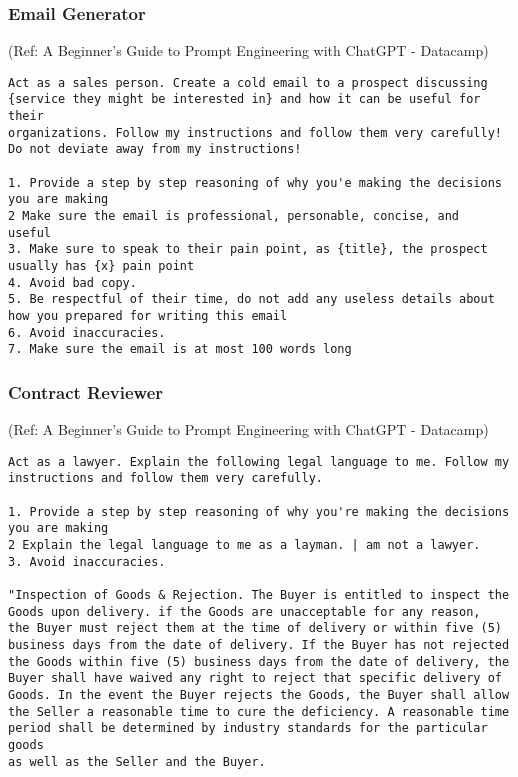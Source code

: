 \begin{frame}[fragile]\frametitle{Email Generator}

{\tiny (Ref: A Beginner's Guide to Prompt Engineering with ChatGPT - Datacamp)}


\begin{lstlisting}
Act as a sales person. Create a cold email to a prospect discussing
{service they might be interested in} and how it can be useful for their
organizations. Follow my instructions and follow them very carefully!
Do not deviate away from my instructions!

1. Provide a step by step reasoning of why you'e making the decisions
you are making
2 Make sure the email is professional, personable, concise, and
useful
3. Make sure to speak to their pain point, as {title}, the prospect
usually has {x} pain point
4. Avoid bad copy.
5. Be respectful of their time, do not add any useless details about
how you prepared for writing this email
6. Avoid inaccuracies.
7. Make sure the email is at most 100 words long
\end{lstlisting}		
		
\end{frame}

\begin{frame}[fragile]\frametitle{Contract Reviewer}

{\tiny (Ref: A Beginner's Guide to Prompt Engineering with ChatGPT - Datacamp)}


\begin{lstlisting}
Act as a lawyer. Explain the following legal language to me. Follow my
instructions and follow them very carefully.

1. Provide a step by step reasoning of why you're making the decisions
you are making
2 Explain the legal language to me as a layman. | am not a lawyer.
3. Avoid inaccuracies.

"Inspection of Goods & Rejection. The Buyer is entitled to inspect the
Goods upon delivery. if the Goods are unacceptable for any reason,
the Buyer must reject them at the time of delivery or within five (5)
business days from the date of delivery. If the Buyer has not rejected
the Goods within five (5) business days from the date of delivery, the
Buyer shall have waived any right to reject that specific delivery of
Goods. In the event the Buyer rejects the Goods, the Buyer shall allow
the Seller a reasonable time to cure the deficiency. A reasonable time
period shall be determined by industry standards for the particular goods
as well as the Seller and the Buyer.
\end{lstlisting}		
		
\end{frame}

